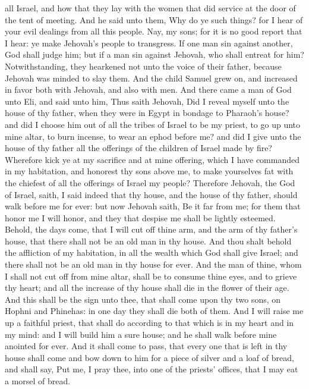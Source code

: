 all Israel, and how that they lay with the women that did service at the door of the tent of meeting. And he said unto them, Why do ye such things? for I hear of your evil dealings from all this people. Nay, my sons; for it is no good report that I hear: ye make Jehovah’s people to transgress. If one man sin against another, God shall judge him; but if a man sin against Jehovah, who shall entreat for him? Notwithstanding, they hearkened not unto the voice of their father, because Jehovah was minded to slay them. And the child Samuel grew on, and increased in favor both with Jehovah, and also with men.  And there came a man of God unto Eli, and said unto him, Thus saith Jehovah, Did I reveal myself unto the house of thy father, when they were in Egypt in bondage to Pharaoh’s house? and did I choose him out of all the tribes of Israel to be my priest, to go up unto mine altar, to burn incense, to wear an ephod before me? and did I give unto the house of thy father all the offerings of the children of Israel made by fire? Wherefore kick ye at my sacrifice and at mine offering, which I have commanded in my habitation, and honorest thy sons above me, to make yourselves fat with the chiefest of all the offerings of Israel my people? Therefore Jehovah, the God of Israel, saith, I said indeed that thy house, and the house of thy father, should walk before me for ever: but now Jehovah saith, Be it far from me; for them that honor me I will honor, and they that despise me shall be lightly esteemed. Behold, the days come, that I will cut off thine arm, and the arm of thy father’s house, that there shall not be an old man in thy house. And thou shalt behold the affliction of my habitation, in all the wealth which God shall give Israel; and there shall not be an old man in thy house for ever. And the man of thine, whom I shall not cut off from mine altar, shall be to consume thine eyes, and to grieve thy heart; and all the increase of thy house shall die in the flower of their age. And this shall be the sign unto thee, that shall come upon thy two sons, on Hophni and Phinehas: in one day they shall die both of them. And I will raise me up a faithful priest, that shall do according to that which is in my heart and in my mind: and I will build him a sure house; and he shall walk before mine anointed for ever. And it shall come to pass, that every one that is left in thy house shall come and bow down to him for a piece of silver and a loaf of bread, and shall say, Put me, I pray thee, into one of the priests’ offices, that I may eat a morsel of bread. 

